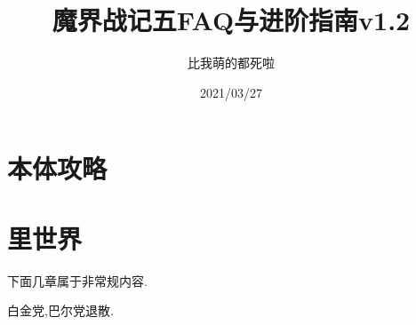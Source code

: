 


\title{魔界战记五FAQ与进阶指南v1.2}
\author{比我萌的都死啦}
\date{2021/03/27}

\maketitle


\newpage
\tableofcontents

\newpage
\part{本体攻略}










\newpage
\part{里世界}

\begin{center}
下面几章属于非常规内容.

白金党,巴尔党退散.
\end{center}











